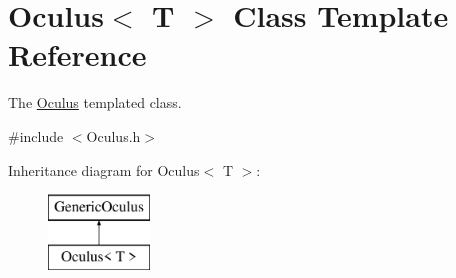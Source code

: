 \hypertarget{classOculus}{}\section{Oculus$<$ T $>$ Class Template Reference}
\label{classOculus}


The \hyperlink{classOculus}{Oculus} templated class.  




{\ttfamily \#include $<$Oculus.\+h$>$}

Inheritance diagram for Oculus$<$ T $>$\+:\begin{figure}[H]
\begin{center}
\leavevmode
\includegraphics[height=2.000000cm]{classOculus}
\end{center}
\end{figure}
